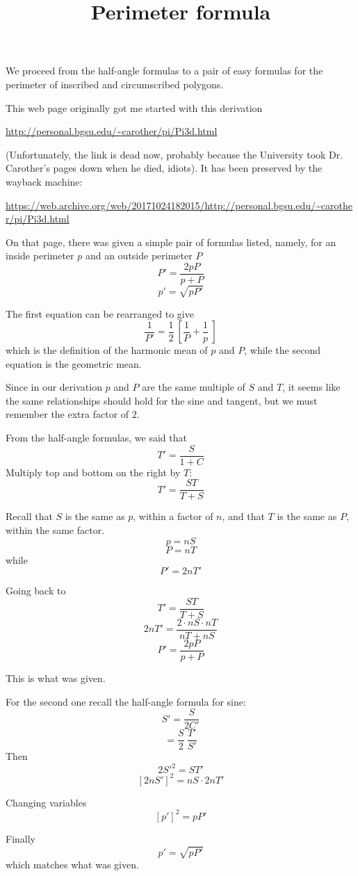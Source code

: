 \documentclass[11pt, oneside]{article}
\title{Perimeter formula}
\date{}
\begin{document}
\maketitle
\Large
We proceed from the half-angle formulas to a pair of easy formulas for the perimeter of inscribed and circumscribed polygons.

This web page originally got me started with this derivation

\url{http://personal.bgsu.edu/~carother/pi/Pi3d.html}

(Unfortunately, the link is dead now, probably because the University took Dr. Carother's pages down when he died, idiots).  It has been preserved by the wayback machine:

\url{https://web.archive.org/web/20171024182015/http://personal.bgsu.edu/~carother/pi/Pi3d.html}

On that page, there was given a simple pair of formulas listed, namely, for an inside perimeter $p$ and an outside perimeter $P$
\[ P' = \frac{2pP}{p + P} \]
\[ p' = \sqrt{pP'} \]

The first equation can be rearranged to give
\[ \frac{1}{P'} = \frac{1}{2} \ [ \frac{1}{P} + \frac{1}{p} \ ] \]
which is the definition of the harmonic mean of $p$ and $P$, while the second equation is the geometric mean.

Since in our derivation $p$ and $P$ are the same multiple of $S$ and $T$, it seems like the same relationships should hold for the sine and tangent, but we must remember the extra factor of $2$.

From the half-angle formulas, we said that
\[ T'  = \frac{S}{1 + C} \]
Multiply top and bottom on the right by $T$:
\[ T' = \frac{ST}{T + S} \]

Recall that $S$ is the same as $p$, within a factor of $n$, and that $T$ is the same as $P$, within the same factor.
\[ p = nS \]
\[ P = nT \]
while 
\[ P' = 2nT' \]

Going back to 
\[ T' = \frac{ST}{T + S} \]
\[ 2nT' = \frac{2 \cdot nS \cdot nT}{nT + nS} \]
\[ P' = \frac{2pP}{p + P} \]

This is what was given.

For the second one recall the half-angle formula for sine:
\[ S' = \frac{S}{2 C'} \]
\[ = \frac{S}{2} \ \frac{T'}{S'} \]
Then
\[ 2S'^2 = ST' \]
\[ [2nS']^2 = nS \cdot 2nT' \]

Changing  variables
\[ [p']^2 = pP' \]

Finally
\[ p' = \sqrt{pP'} \]
which matches what was given.
\end{document}
